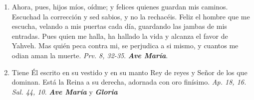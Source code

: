\documentclass[../../devocionario.tex]{subfiles}
\begin{document}
\begin{enumerate}
        \item Ahora, pues, hijos míos, oídme; y felices quienes guardan mis caminos. Escuchad la corrección y sed sabios, y no la rechacéis.  
            Feliz el hombre que me escucha, velando a mis puertas cada día, guardando las jambas de mis entradas. Pues quien me halla, ha hallado la vida y alcanza el favor 
            de Yahveh. Mas quién peca contra mi, se perjudica a si mismo, y cuantos me odian aman la muerte. \textit{Prv. 8, 32-35}. \textbf{\textit{Ave María}}.

        \item Tiene Él escrito en su vestido y en su manto Rey de reyes y Señor de los que dominan. Está la Reina a su derecha, adornada con oro finísimo. 
            \textit{Ap. 18, 16. Sal. 44, 10}. \textbf{\textit{Ave María}} y \textbf{\textit{Gloria}}

    \end{enumerate}
\end{document}
